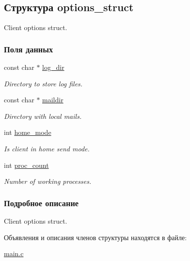 \hypertarget{structoptions__struct}{}\subsection{Структура options\+\_\+struct}
\label{structoptions__struct}


Client options struct.  


\subsubsection*{Поля данных}
\begin{DoxyCompactItemize}
\item 
const char $\ast$ \hyperlink{structoptions__struct_aec264640c0be1eb696ccce558774e084}{log\+\_\+dir}\hypertarget{structoptions__struct_aec264640c0be1eb696ccce558774e084}{}\label{structoptions__struct_aec264640c0be1eb696ccce558774e084}

\begin{DoxyCompactList}\small\item\em Directory to store log files. \end{DoxyCompactList}\item 
const char $\ast$ \hyperlink{structoptions__struct_a19bb55fae150944b0393e9acf4a3f4a3}{maildir}\hypertarget{structoptions__struct_a19bb55fae150944b0393e9acf4a3f4a3}{}\label{structoptions__struct_a19bb55fae150944b0393e9acf4a3f4a3}

\begin{DoxyCompactList}\small\item\em Directory with local mails. \end{DoxyCompactList}\item 
int \hyperlink{structoptions__struct_ae4d04a68817af834db9fb2be4d324025}{home\+\_\+mode}\hypertarget{structoptions__struct_ae4d04a68817af834db9fb2be4d324025}{}\label{structoptions__struct_ae4d04a68817af834db9fb2be4d324025}

\begin{DoxyCompactList}\small\item\em Is client in home send mode. \end{DoxyCompactList}\item 
int \hyperlink{structoptions__struct_a757ac252e0d163b1557bf83198f8e8fc}{proc\+\_\+count}\hypertarget{structoptions__struct_a757ac252e0d163b1557bf83198f8e8fc}{}\label{structoptions__struct_a757ac252e0d163b1557bf83198f8e8fc}

\begin{DoxyCompactList}\small\item\em Number of working processes. \end{DoxyCompactList}\end{DoxyCompactItemize}


\subsubsection{Подробное описание}
Client options struct. 

Объявления и описания членов структуры находятся в файле\+:\begin{DoxyCompactItemize}
\item 
\hyperlink{main_8c}{main.\+c}\end{DoxyCompactItemize}
